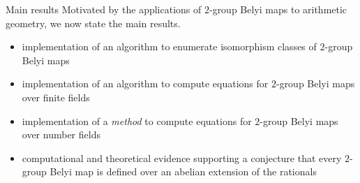 \documentclass[handout,xcolor=dvipsnames]{beamer}
\theoremstyle{plain}
\begin{document}
{    \begin{frame}{Main results}
      Motivated by the applications of
      $2$-group Belyi maps to arithmetic geometry,
      we now state the main results.
      \pause
      \begin{itemize}
        \item
          implementation of an algorithm to
          enumerate isomorphism classes
          of $2$-group Belyi maps
          \pause
        \item
          implementation of an algorithm to
          compute equations for
          $2$-group Belyi maps
          over finite fields
          \pause
        \item
          implementation of a \emph{method}
          to compute equations for
          $2$-group Belyi maps
          over number fields
          \pause
        \item
          computational and theoretical evidence
          supporting a conjecture that
          every $2$-group Belyi map
          is defined over an
          abelian extension of the rationals
      \end{itemize}
    \end{frame}
  }
\end{document}
